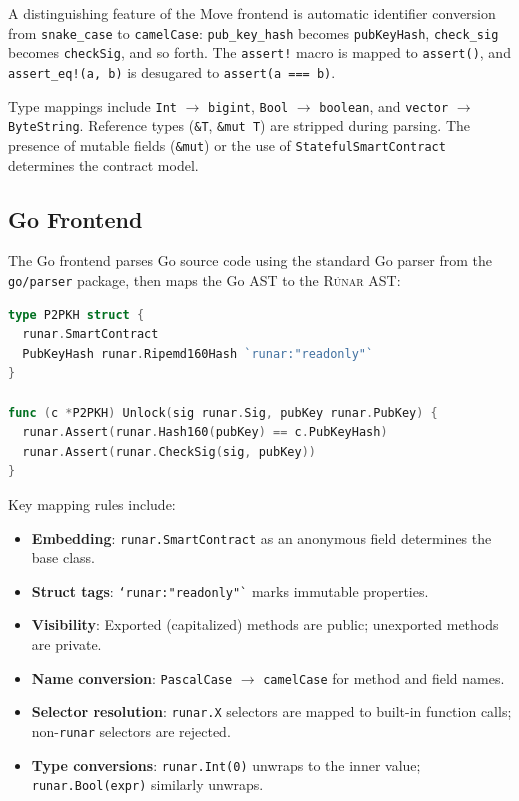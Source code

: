 \documentclass[11pt,a4paper]{article}
\newcommand{\runar}{\textsc{Rúnar}}
\newcommand{\bs}{\texttt{ByteString}}
\newcommand{\bigintty}{\texttt{bigint}}
\newcommand{\boolty}{\texttt{boolean}}
\begin{document}
A distinguishing feature of the Move frontend is automatic identifier
conversion from \texttt{snake\_case} to \texttt{camelCase}:
\texttt{pub\_key\_hash} becomes \texttt{pubKeyHash},
\texttt{check\_sig} becomes \texttt{checkSig}, and so forth. The
\texttt{assert!} macro is mapped to \texttt{assert()}, and
\texttt{assert\_eq!(a, b)} is desugared to \texttt{assert(a === b)}.

Type mappings include \texttt{Int} $\to$ \bigintty{},
\texttt{Bool} $\to$ \boolty{}, and \texttt{vector} $\to$ \bs{}.
Reference types (\texttt{\&T}, \texttt{\&mut T}) are stripped during parsing.
The presence of mutable fields (\texttt{\&mut}) or the use of
\texttt{StatefulSmartContract} determines the contract model.

\subsection{Go Frontend}
\label{sec:frontend-go}

The Go frontend parses Go source code using the standard Go parser from
the \texttt{go/parser} package, then maps the Go AST to the \runar{} AST:

\begin{lstlisting}[style=runar,language=Go,
  morekeywords={type,struct,func}]
type P2PKH struct {
  runar.SmartContract
  PubKeyHash runar.Ripemd160Hash `runar:"readonly"`
}

func (c *P2PKH) Unlock(sig runar.Sig, pubKey runar.PubKey) {
  runar.Assert(runar.Hash160(pubKey) == c.PubKeyHash)
  runar.Assert(runar.CheckSig(sig, pubKey))
}
\end{lstlisting}

Key mapping rules include:

\begin{itemize}[nosep]
  \item \textbf{Embedding}: \texttt{runar.SmartContract} as an anonymous
    field determines the base class.
  \item \textbf{Struct tags}: \texttt{`runar:"readonly"`} marks immutable
    properties.
  \item \textbf{Visibility}: Exported (capitalized) methods are public;
    unexported methods are private.
  \item \textbf{Name conversion}: \texttt{PascalCase} $\to$
    \texttt{camelCase} for method and field names.
  \item \textbf{Selector resolution}: \texttt{runar.X} selectors are mapped
    to built-in function calls; non-\texttt{runar} selectors are rejected.
  \item \textbf{Type conversions}: \texttt{runar.Int(0)} unwraps to the
    inner value; \texttt{runar.Bool(expr)} similarly unwraps.
\end{itemize}
\end{document}
